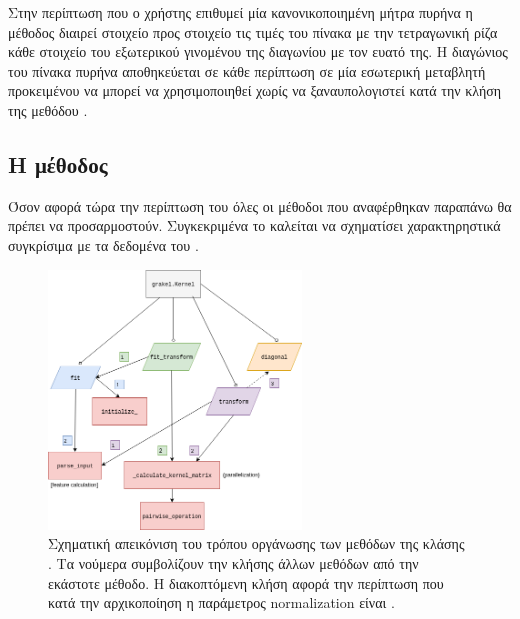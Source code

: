 Στην περίπτωση που ο χρήστης επιθυμεί μία κανονικοποιημένη μήτρα πυρήνα η μέθοδος \texttt{} διαιρεί στοιχείο προς στοιχείο τις τιμές του πίνακα με την τετραγωνική ρίζα κάθε στοιχείο του εξωτερικού γινομένου της διαγωνίου με τον ευατό της.
Η διαγώνιος του πίνακα πυρήνα αποθηκεύεται σε κάθε περίπτωση σε μία εσωτερική μεταβλητή προκειμένου να μπορεί να χρησιμοποιηθεί χωρίς να ξαναυπολογιστεί κατά την κλήση της μεθόδου \texttt{}.
\subsection{Η μέθοδος \texttt{}}
Όσον αφορά τώρα την περίπτωση του \texttt{} όλες οι μέθοδοι που αναφέρθηκαν παραπάνω θα πρέπει να προσαρμοστούν.
Συγκεκριμένα το \texttt{} καλείται να σχηματίσει χαρακτηρηστικά συγκρίσιμα με τα δεδομένα του \texttt{}.

\begin{figure}[]
    \centering
    \includegraphics[width=0.6\textwidth]{figures/KernelStructure.png}
    \caption{Σχηματική απεικόνιση του τρόπου οργάνωσης των μεθόδων της κλάσης . Τα νούμερα συμβολίζουν την κλήσης άλλων μεθόδων από την εκάστοτε μέθοδο. Η διακοπτόμενη κλήση αφορά την περίπτωση που κατά την αρχικοποίηση η παράμετρος normalization είναι .}
    \label{fig:kernel_structure}
\end{figure}

